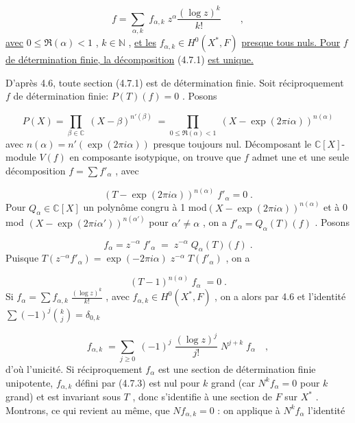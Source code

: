 \begin{equation}\tag{4.7.1}
f = \sum_{\alpha, k} \; f_{\alpha, k} \; z^{\alpha}\frac{(\log z)^k}{k!} \qquad ,
\end{equation}
\underline{avec} $0 \leq \Re(\alpha) < 1$ , $k \in \mathbb{N}$ , \underline{et les} $f_{\alpha, k} \in H^0(X^*, F)$ \underline{presque tous nuls. Pour} $f$ \underline{de détermination finie, la décomposition} (4.7.1) \underline{est unique.}



D'après 4.6, toute section (4.7.1) est de détermination finie. Soit réciproquement $f$ de détermination finie: $P(T) (f) = 0$ . Posons

\begin{equation*}
P(X) = \prod_{\beta \in \mathbb{C}} \; (X-\beta)^{n'(\beta)} \; = \prod_{0 \leq \Re(\alpha) < 1} \; (X-\exp(2\pi i\alpha))^{n(\alpha)}
\end{equation*}
avec $n(\alpha) = n'(\exp(2\pi i\alpha))$ presque toujours nul. Décomposant le $\mathbb{C}[X]$-module $V(f)$ en composante isotypique, on trouve que $f$ admet une et une seule décomposition $f = \sum f'_{\alpha}$ , avec

\begin{equation*}
(T-\exp(2\pi i\alpha))^{n(\alpha)} \; f'_{\alpha} = 0 \; .
\end{equation*}
Pour $Q_{\alpha} \in \mathbb{C}[X]$ un polynôme congru à 1 mod$(X- \exp(2\pi i\alpha))^{n(\alpha)}$ et à 0 mod $(X - \exp(2\pi i\alpha'))^{n(\alpha')}$ pour $\alpha' \neq \alpha$ , on a $f'_{\alpha} = Q_{\alpha}(T) (f)$ . Posons

\begin{equation}\tag{4.7.2}
f_{\alpha} = z^{-\alpha} \; f'_{\alpha} \; = \; z^{-\alpha} \; Q_{\alpha}(T) (f) \; .
\end{equation}
Puisque $T(z^{-\alpha} f'_{\alpha}) = \exp(-2\pi i\alpha) \; z^{-\alpha} \; T(f'_{\alpha})$ , on a

\begin{equation*}
(T-1)^{n(\alpha)} \; f_{\alpha} \; = 0 \; .
\end{equation*}
Si $f_{\alpha} = \sum f_{\alpha, k} \; \frac{(\log z)^k}{k!}$ , avec $f_{\alpha, k} \in H^0(X^*, F)$ , on a alors par 4.6 et l'identité $\sum (-1)^j {k \choose j} = \delta_{0, k}$

\begin{equation}\tag{4.7.3}
f_{\alpha, k} \; = \sum_{j \geq 0} \; (-1)^j \; \frac{(\log z)^j}{j!} \; N^{j+k} \; f_{\alpha} \quad ,
\end{equation}
d'où l'unicité. Si réciproquement $f_{\alpha}$ est une section de détermination finie unipotente, $f_{\alpha, k}$ défini par (4.7.3) est nul pour $k$ grand (car $N^k f_{\alpha} = 0$ pour $k$ grand) et est invariant sous $T$ , donc s'identifie à une section de $F$ sur $X^*$ . Montrons, ce qui revient au même, que $N f_{\alpha, k} = 0$ : on applique à $N^k f_{\alpha}$ l'identité

